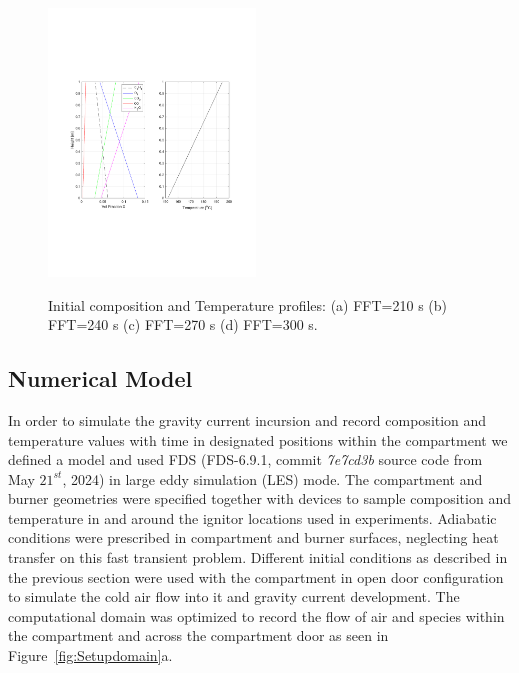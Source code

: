 \documentclass[12pt,letterpaper]{article}
\begin{document}
\begin{flushleft}
\begin{figure}[H]
    \includegraphics[trim = 22mm 70mm 27mm 72mm, clip,width=0.49\textwidth]{AOSFST_Paper/Figures/CompositionTemp_FFT_300s}
     \\
    \caption{Initial composition and Temperature profiles: (a) FFT=210 s (b) FFT=240 s (c) FFT=270 s (d) FFT=300 s. }    
    \label{fig:InitCond}
\end{figure}


\subsection{Numerical Model} \addvspace{10pt}
\label{sec:nummodel}

In order to simulate the gravity current incursion and record composition and temperature values with time in designated positions within the compartment we defined a model and used FDS (FDS-6.9.1, commit \textit{7e7cd3b} source code from May $21^{st}$, 2024) in large eddy simulation (LES) mode. The compartment and burner geometries were specified together with devices to sample composition and temperature in and around the ignitor locations used in experiments. Adiabatic conditions were prescribed in compartment and burner surfaces, neglecting heat transfer on this fast transient problem. Different initial conditions as described in the previous section were used with the compartment in open door configuration to simulate the cold air flow into it and gravity current development. The computational domain was optimized to record the flow of air and species within the compartment and across the compartment door as seen in Figure~\ref{fig:Setupdomain}a. 



\end{flushleft}
\end{document}
